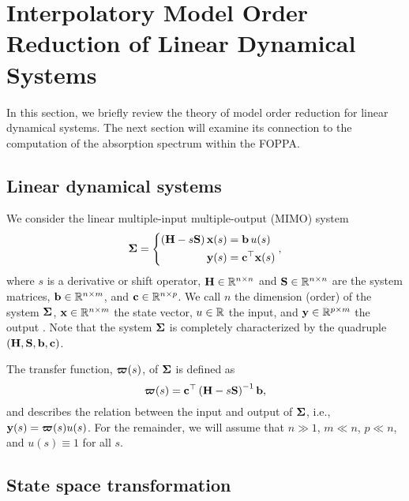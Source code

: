 \section{Interpolatory Model Order Reduction of Linear Dynamical Systems}
\label{lds:dyn-sys}

In this section, we briefly review the theory of model order reduction for
linear dynamical systems. The next section will examine its connection to the
computation of the absorption spectrum within the FOPPA.

\subsection{Linear dynamical systems}
\label{lds:mimo}

We consider the linear multiple-input multiple-output (MIMO) system
\begin{equation}
  \mathbf{\Sigma} = \left\{\begin{aligned}
    \left( \mathbf{H} - s\mathbf{S} \right) \mathbf{x}(s) &= \mathbf{b}\,u(s) \\
                              \mathbf{y}(s) &= \mathbf{c}^\top \mathbf{x}(s)
  \end{aligned}\right.,
  \label{eq:siso}
\end{equation}
where $s$ is a derivative or shift operator, $\bH \inRR{n}$ and $\bS \inRR{n}$ are the system matrices, $\bfb \inR[n][m]$, and $\bfc \inR[n][p]$. We call $n$ the dimension  (order) of the system $\mathbf{\Sigma}$, $\bfx \inR[n][m]$ the state vector, $u \inR$ the input, and $\bfy \inR[p][m]$ the output \cite{Antoulas2005}. Note that the system $\mathbf{\Sigma}$ is completely characterized by the quadruple $(\mathbf{H},\mathbf{S},\mathbf{b},\mathbf{c})$.

The transfer function, $\boldsymbol{\varpi}(s)$, of $\mathbf{\Sigma}$ is defined as
\begin{equation}
  \boldsymbol{\varpi}(s) = \mathbf{c}^\top \left( \mathbf{H} - s\mathbf{S} \right)^{-1} \mathbf{b},
  \label{eq:siso-tf}
\end{equation}
and describes the relation between the input and output of $\mathbf{\Sigma}$, i.e., $\mathbf{y}(s) = \boldsymbol{\varpi}(s) u(s)$. For the remainder, we will assume that $n \gg 1$, $m \ll n$, $p \ll n$, and $u(s) \equiv 1$ for all $s$.

\subsection{State space transformation}
\label{lds:ss-transf}

